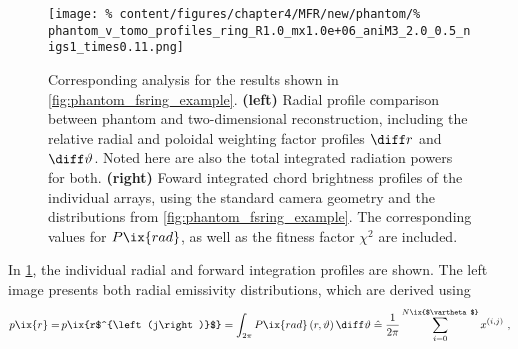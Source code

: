 %
           \begin{figure}[t]%
               \centering%
               \texttt{[image: \%
                   content/figures/chapter4/MFR/new/phantom/\%
                   phantom\_v\_tomo\_profiles\_ring\_R1.0\_mx1.0e+06\_aniM3\_2.0\_0.5\_nigs1\_times0.11.png]}%
               \caption{Corresponding analysis for the results shown in \cref{fig:phantom_fsring_example}. \textbf{(left)} Radial profile comparison between phantom and two-dimensional reconstruction, including the relative radial and poloidal weighting factor profiles $\diff r$ and $\diff\vartheta$. Noted here are also the total integrated radiation powers for both. \textbf{(right)} Foward integrated chord brightness profiles of the individual arrays, using the standard camera geometry and the distributions from \cref{fig:phantom_fsring_example}. The corresponding values for $P\ix{rad}$, as well as the fitness factor $\chi^2$ are included.}\label{fig:phantom_fsring_example_profiles}%
           \end{figure}%
%
           In \cref{fig:phantom_fsring_example_profiles}, the individual radial and forward integration profiles are shown. The left image presents both radial emissivity distributions, which are derived using%
%
           \begin{align}%
               \begin{split}%
                   p\ix{r}=\,&p\ix{r$^{\left(j\right)}$}=\int_{2\pi}P\ix{rad}\left(r,\vartheta\right)\diff\vartheta%
                   \mathrel{\hat{=}}\frac{1}{2\pi}\sum_{i=0}^{N\ix{$\vartheta$}}x^{\left(i,j\right)}\,\,,\\%
               \end{split}\label{eq:averageprofiles}%
           \end{align}%
%
